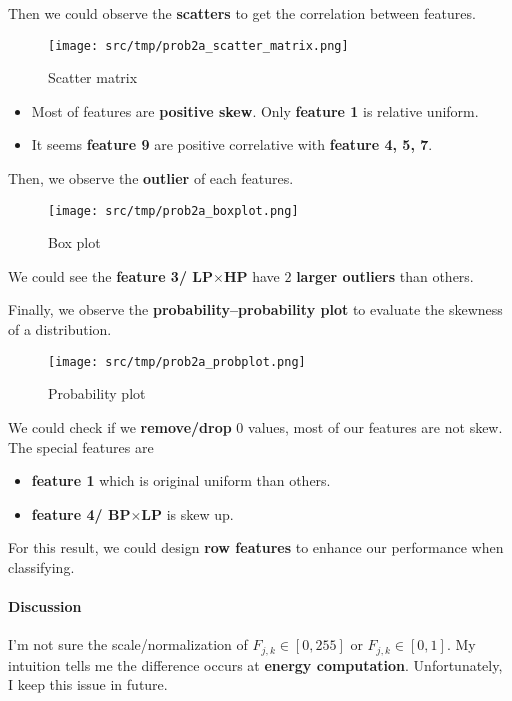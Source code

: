 Then we could observe the \textbf{scatters}  to get the correlation between features.
\begin{figure}
    \centering
    \texttt{[image: src/tmp/prob2a\_scatter\_matrix.png]}
    \caption{Scatter matrix}
    \label{prob2a_scatter_matrix}
\end{figure}

\begin{itemize}
    \item Most of features are \textbf{positive skew}. Only \textbf{feature 1} is relative uniform.
    \item It seems \textbf{feature 9} are positive correlative with \textbf{feature 4, 5, 7}.
\end{itemize}

Then, we observe the \textbf{outlier}  of each features.
\begin{figure}
    \centering
    \texttt{[image: src/tmp/prob2a\_boxplot.png]}
    \caption{Box plot}
    \label{prob2a_boxplot}
\end{figure}
We could see the \textbf{feature 3/ LP\(\times\)HP} have \(2\) \textbf{larger outliers} than others.

Finally, we observe the \textbf{probability–probability plot}  to evaluate the skewness of a distribution.
\begin{figure}
    \centering
    \texttt{[image: src/tmp/prob2a\_probplot.png]}
    \caption{Probability plot}
    \label{prob2a_probplot}
\end{figure}
We could check if we \textbf{remove/drop} \(0\) values, most of our features are not skew. The special features are 
\begin{itemize}
    \item \textbf{feature 1} which is original uniform than others.
    \item \textbf{feature 4/ BP\(\times\)LP} is skew up.
\end{itemize}
For this result, we could design \textbf{row features} to enhance our performance when classifying.

\paragraph{Discussion}
I'm not sure the scale/normalization of \(F_{j, k} \in [0, 255]\) or \(F_{j, k} \in [0, 1]\). My intuition tells me the difference occurs at \textbf{energy computation}.
Unfortunately, I keep this issue in future.


